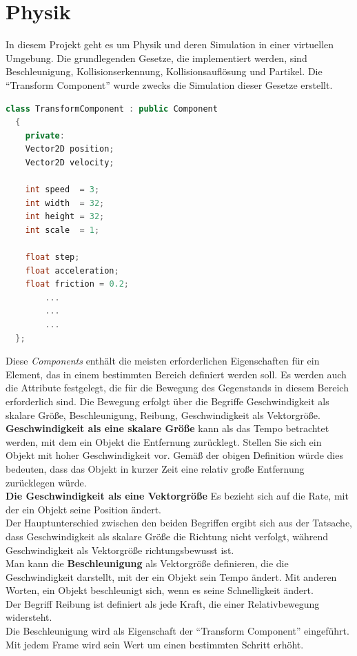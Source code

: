 \documentclass[
  10pt,
  a4paper,
  oneside,
  headers,
  headinclude,
  footinclude,
  BCOR5mm,
]{article}
\begin{document}
\section{Physik}
In diesem Projekt geht es um Physik und deren Simulation in einer virtuellen Umgebung. Die grundlegenden Gesetze, die implementiert werden, sind Beschleunigung, Kollisionserkennung, Kollisionsauflösung und Partikel. Die ``Transform Component'' wurde zwecks die Simulation dieser Gesetze erstellt.

\begin{lstlisting}[language=C++]
  class TransformComponent : public Component
  {
    private:
    Vector2D position;
    Vector2D velocity;

    int speed  = 3;
    int width  = 32;
    int height = 32;
    int scale  = 1;

    float step;
    float acceleration;
    float friction = 0.2;
        ...
        ...
        ...
  };
\end{lstlisting}

Diese \textit{Components} enthält die meisten erforderlichen Eigenschaften für ein Element, das in einem bestimmten Bereich definiert werden soll. Es werden auch die Attribute festgelegt, die für die Bewegung des Gegenstands in diesem Bereich erforderlich sind.
Die Bewegung erfolgt über die Begriffe Geschwindigkeit als skalare Größe, Beschleunigung, Reibung, Geschwindigkeit als Vektorgröße. \\
\textbf{Geschwindigkeit als eine skalare Größe} kann als das Tempo betrachtet werden, mit dem ein Objekt die Entfernung zurücklegt. Stellen Sie sich ein Objekt mit hoher Geschwindigkeit vor. Gemäß der obigen Definition würde dies bedeuten, dass das Objekt in kurzer Zeit eine relativ große Entfernung zurücklegen würde. \\
\textbf{Die Geschwindigkeit als eine Vektorgröße} Es bezieht sich auf die Rate, mit der ein Objekt seine Position ändert.\\
Der Hauptunterschied zwischen den beiden Begriffen ergibt sich aus der Tatsache, dass Geschwindigkeit als skalare Größe die Richtung nicht verfolgt, während Geschwindigkeit als Vektorgröße richtungsbewusst ist. \\
Man kann die \textbf{Beschleunigung} als Vektorgröße definieren, die die Geschwindigkeit darstellt, mit der ein Objekt sein Tempo ändert. Mit anderen Worten, ein Objekt beschleunigt sich, wenn es seine Schnelligkeit ändert.\\
Der Begriff Reibung ist definiert als jede Kraft, die einer Relativbewegung widersteht. \\
Die Beschleunigung wird als Eigenschaft der ``Transform Component'' eingeführt. Mit jedem Frame wird sein Wert um einen bestimmten Schritt erhöht.
\end{document}
